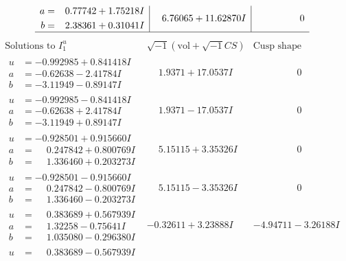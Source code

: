 \documentclass[1p]{elsarticle_modified}
\theoremstyle{definition}
\newcommand{\I}{\sqrt{-1}}
\begin{document}
$$\begin{array}{c|c|c}
\begin{aligned}
a &= \phantom{-}0.77742 + 1.75218 I \\
b &= \phantom{-}2.38361 + 0.31041 I\end{aligned}
 & \phantom{-}6.76065 + 11.62870 I & \phantom{-0.000000 } 0\\
 \hline 
 \end{array}$$\newpage$$\begin{array}{c|c|c}  
\text{Solutions to }I^u_{1}& \I (\text{vol} + \sqrt{-1}CS) & \text{Cusp shape}\\
 \hline 
\begin{aligned}
u &= -0.992985 + 0.841418 I \\
a &= -0.62638 - 2.41784 I \\
b &= -3.11949 - 0.89147 I\end{aligned}
 & \phantom{-}1.9371 + 17.0537 I & \phantom{-0.000000 } 0 \\ \hline\begin{aligned}
u &= -0.992985 - 0.841418 I \\
a &= -0.62638 + 2.41784 I \\
b &= -3.11949 + 0.89147 I\end{aligned}
 & \phantom{-}1.9371 - 17.0537 I & \phantom{-0.000000 } 0 \\ \hline\begin{aligned}
u &= -0.928501 + 0.915660 I \\
a &= \phantom{-}0.247842 + 0.800769 I \\
b &= \phantom{-}1.336460 + 0.203273 I\end{aligned}
 & \phantom{-}5.15115 + 3.35326 I & \phantom{-0.000000 } 0 \\ \hline\begin{aligned}
u &= -0.928501 - 0.915660 I \\
a &= \phantom{-}0.247842 - 0.800769 I \\
b &= \phantom{-}1.336460 - 0.203273 I\end{aligned}
 & \phantom{-}5.15115 - 3.35326 I & \phantom{-0.000000 } 0 \\ \hline\begin{aligned}
u &= \phantom{-}0.383689 + 0.567939 I \\
a &= \phantom{-}1.32258 - 0.75641 I \\
b &= \phantom{-}1.035080 - 0.296380 I\end{aligned}
 & -0.32611 + 3.23888 I & -4.94711 - 3.26188 I \\ \hline\begin{aligned}
u &= \phantom{-}0.383689 - 0.567939 I \\

\end{aligned}
\end{array}$$
\end{document}
